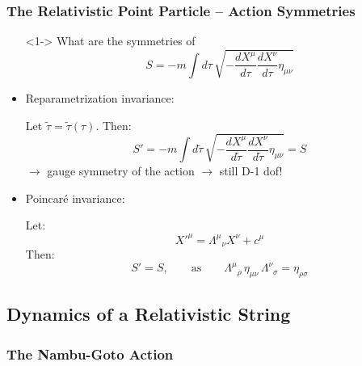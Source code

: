 \documentclass[aspectratio=169]{beamer}
\begin{document}
	\begin{frame}
		\frametitle{The Relativistic Point Particle -- Action Symmetries}
		\begin{itemize}
			\item[]<1-> What are the symmetries of
			\begin{equation*}
				S = -m \int d\tau \, \sqrt{-\frac{dX^\mu}{d\tau} \frac{dX^\nu}{d\tau}\eta_{\mu\nu}}
			\end{equation*}
			\item<2-> Reparametrization invariance:
			\begin{flushleft}
				Let $\tilde{\tau} = \tilde{\tau}(\tau)$. Then:
				\begin{equation*}
					S' = -m \int d\tilde{\tau} \, \sqrt{-\frac{dX^\mu}{d\tilde{\tau}}\frac{dX^\nu}{d\tilde{\tau}}\eta_{\mu\nu}} = S
				\end{equation*}
				$\rightarrow$ gauge symmetry of the action $\rightarrow$ still D-1 dof!
			\end{flushleft}
			\item<2-> Poincaré invariance:
			\begin{flushleft}
				Let:
				\begin{equation*}
					X'^\mu = \Lambda^\mu{}_\nu X^\nu + c^\mu
				\end{equation*}
				Then:
				\begin{equation*}
					S'=S, \qquad \text{as} \qquad \Lambda^\mu{}_\rho \, \eta_{\mu\nu} \, \Lambda^\nu{}_\sigma = \eta_{\rho\sigma}
				\end{equation*}
			\end{flushleft}
		\end{itemize}
	\end{frame}

	\subsection{Dynamics of a Relativistic String}
	\subsubsection{The Nambu-Goto Action}
\end{document}
